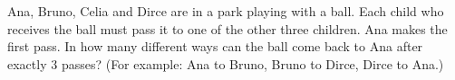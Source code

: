Ana, Bruno, Celia and Dirce are in a park playing with a ball. Each child who receives the ball must pass it to one of the other three children. Ana makes the first pass. In how many different ways can the ball come back to Ana after exactly $3$ passes? (For example: Ana to Bruno, Bruno to Dirce, Dirce to Ana.)
